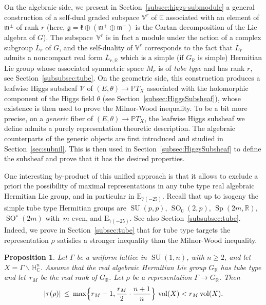 \documentclass[JEP,XML,SOM,Unicode,NoFloatCountersInSection]{cedram}
\let\mathcal\mathscr
\theoremstyle{plain}
\newtheorem{propA}[theoA]{Proposition}
\theoremstyle{definition}
\let\ov\overline
\let\rgy r
\DeclareMathOperator{\SO}{SO}
\DeclareMathOperator{\SU}{SU}
\DeclareMathOperator{\Sp}{Sp}
\DeclareMathOperator{\vol}{vol}
\newcommand{\cV}{\mathcal{V}}
\newcommand{\bE}{\mathbb{E}}
\newcommand{\bR}{\mathbb{R}}
\newcommand{\HC}{{\mathbb{H}^n_\mathbb{C}}}
\newcommand{\PTX}{{\mathbb{P}T_X}}
\newcommand{\Vr}{\mathbb{V}^\rgy}
\newcommand{\fgg}{\mathfrak{g}}
\newcommand{\fk}{\mathfrak{k}}
\newcommand{\fm}{\mathfrak{m}}
\newcommand{\rkm}{{r_M}}
\begin{document}
On the algebraic side, we present in
Section~\ref{subsec:higgs-submodule} a general
construction of a self-dual graded subspace $\Vr$ of $\bE$ associated with an element of
$\fm^\pm$ of rank $r$ (here,
$\fgg = \fk \oplus (\fm^+ \oplus \fm^-)$ is the Cartan decomposition of the Lie algebra of
$G$). The subspace~$\Vr$ is in fact a module under the action of a complex subgroup $\ov{L}_r$
of $G$, and the self-duality of $\Vr$ corresponds to the fact that $\ov{L}_r$ admits a noncompact
real form $\ov{L}_{r,\bR}$ which is a simple (if $G_\bR$ is simple) Hermitian Lie group whose
associated symmetric space
$M_r$ is of \emph{tube type} and has rank $r$, see Section~\ref{subsubsec:tube}.
On the geometric side, this construction produces a leafwise
Higgs subsheaf $\cV$ of $(E,\theta)\to\PTX$ associated with the holomorphic component
of the Higgs field $\theta$ (see Section~\ref{subsec:HiggsSubsheaf}), whose existence is then used to
prove the
Milnor-Wood inequality. To be a bit more precise, on a \emph{generic} fiber of $(E,\theta)\to\PTX$, the
leafwise Higgs subsheaf we define admits a
purely representation theoretic description. The algebraic counterparts of the generic objects
are first introduced and studied in
Section~\ref{sec:subnil}. This is then used in Section~\ref{subsec:HiggsSubsheaf} to define the subsheaf
and prove that it has the desired properties.

One interesting by-product of this unified approach is that it allows to exclude a priori the
possibility of maximal representations in any tube type
real algebraic Hermitian Lie group, and in particular in $\mathrm{E}_{7(-25)}$. Recall
that up to isogeny the simple tube type
Hermitian groups are $\SU(p,p)$, $\SO_0(2,p)$, $\Sp(2m,\bR)$, $\SO^\star(2m)$ with~$m$ even,
and $\mathrm{E}_{7(-25)}$. See also Section~\ref{subsubsec:tube}. Indeed,
we prove in Section~\ref{subsec:tube} that for tube type targets
the representation $\rho$ satisfies a stronger inequality than the Milnor-Wood inequality.

\begin{propA}
\label{mainprop}
Let $\Gamma$ be a uniform lattice in $\SU(1,n)$, with $n\geq 2$, and let $X=\Gamma\backslash\HC$.
Assume that the real algebraic Hermitian Lie group $G_\bR$ has tube type and let~$\rkm$ be the real rank of $G_\bR$. Let $\rho$ be a
representation $\Gamma\to G_\bR$. Then
$$ |\tau(\rho)|\,\leq\, \max\Bigl\{{\rkm-1,\frac \rkm{2}\cdot \frac{n+1}{n}}\Bigr\}\,
\vol(X)<\rkm \vol(X).$$
\end{propA}
\end{document}
